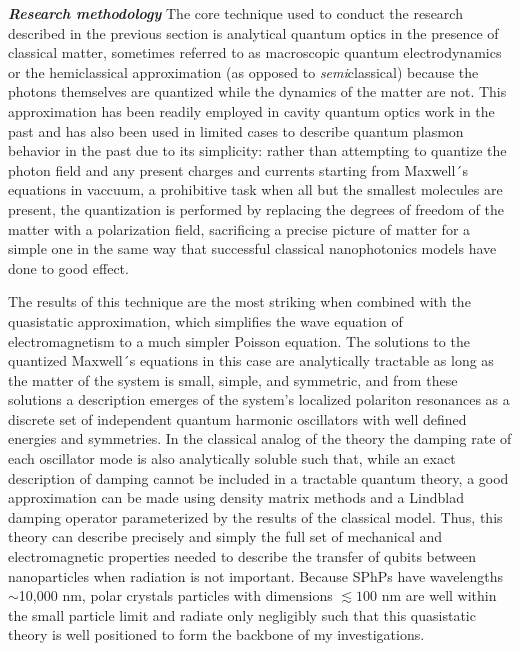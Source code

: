 \documentclass[11pt,a4paper]{article}
\begin{document}
\textbf{\textit{Research methodology}} The core technique used to conduct the research described in the previous section is analytical quantum optics in the presence of classical matter, sometimes referred to as macroscopic quantum electrodynamics or the hemiclassical approximation (as opposed to \textit{semi}classical) because the photons themselves are quantized while the dynamics of the matter are not. This approximation has been readily employed in cavity quantum optics work in the past\supercite{dalton_field_1996} and has also been used in limited cases to describe quantum plasmon behavior in the past due to its simplicity:\supercite{asenjo-garcia_plasmon_2013} rather than attempting to quantize the photon field and any present charges and currents starting from Maxwell´s equations in vaccuum, a prohibitive task when all but the smallest molecules are present, the quantization is performed by replacing the degrees of freedom of the matter with a polarization field, sacrificing a precise picture of matter for a simple one in the same way that successful classical nanophotonics models have done to good effect.





The results of this technique are the most striking when combined with the quasistatic approximation, which simplifies the wave equation of electromagnetism to a much simpler Poisson equation. The solutions to the quantized Maxwell´s equations in this case are analytically tractable as long as the matter of the system is small, simple, and symmetric, and from these solutions a description emerges of the system's localized polariton resonances as a discrete set of independent quantum harmonic oscillators with well defined energies and symmetries. In the classical analog of the theory the damping rate of each oscillator mode is also analytically soluble such that, while an exact description of damping cannot be included in a tractable quantum theory, a good approximation can be made using density matrix methods and a Lindblad damping operator parameterized by the results of the classical model. Thus, this theory can describe precisely and simply the full set of mechanical and electromagnetic properties needed to describe the transfer of qubits between nanoparticles when radiation is not important. Because SPhPs have wavelengths $\sim$10,000 nm, polar crystals particles with dimensions $\lesssim100$ nm are well within the small particle limit and radiate only negligibly such that this quasistatic theory is well positioned to form the backbone of my investigations.
\end{document}
